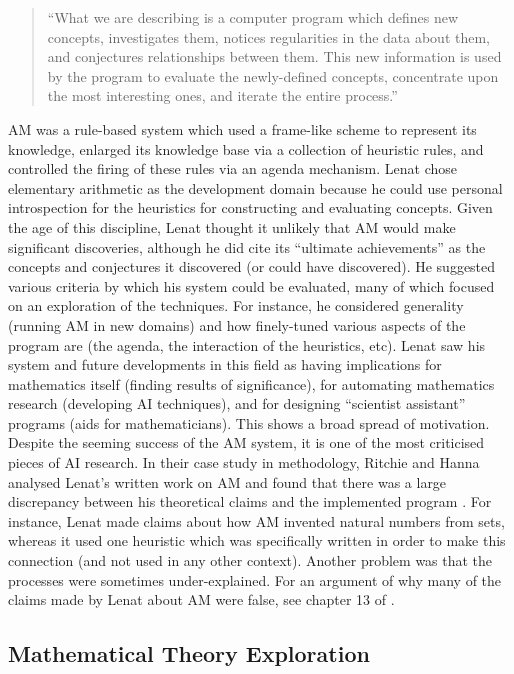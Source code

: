 \begin{quote}
``What we are describing is a computer program which
defines new concepts, investigates them, notices
regularities in the data about them, and conjectures
relationships between them. This new information is used
by the program to evaluate the newly-defined concepts,
concentrate upon the most interesting ones, and iterate the
entire process.'' \cite[p. 834]{lenat:77}
\end{quote}

AM was a rule-based system which used a frame-like scheme to represent
its knowledge, enlarged its knowledge base via a collection of
heuristic rules, and controlled the firing of these rules via an
agenda mechanism. Lenat chose elementary arithmetic as the development
domain because he could use personal introspection for the heuristics
for constructing and evaluating concepts. Given the age of this
discipline, Lenat thought it unlikely that AM would make significant
discoveries, although he did cite its ``ultimate achievements'' as the
concepts and conjectures it discovered (or could have discovered). He
suggested various criteria by which his system could be evaluated,
many of which focused on an exploration of the techniques. For
instance, he considered generality (running AM in new domains) and how
finely-tuned various aspects of the program are (the agenda, the
interaction of the heuristics, etc). %
Lenat saw his system and future developments in this field as having
implications for mathematics itself (finding results of significance),
for automating mathematics research (developing AI techniques), and
for designing ``scientist assistant'' programs (aids for
mathematicians). This shows a broad spread of motivation. Despite the
seeming success of the AM system, it is one of the most criticised
pieces of AI research. In their case study in methodology, Ritchie and
Hanna analysed Lenat's written work on AM and found that there was a
large discrepancy between his theoretical claims and the implemented
program \cite{partridge}. For instance, Lenat made claims about how AM
invented natural numbers from sets, whereas it used one heuristic
which was specifically written in order to make this connection (and
not used in any other context). Another problem was that the processes
were sometimes under-explained. For an argument of why many of the
claims made by Lenat about AM were false, see chapter 13 of
\cite{colton:book}.

\subsection{Mathematical Theory Exploration}

